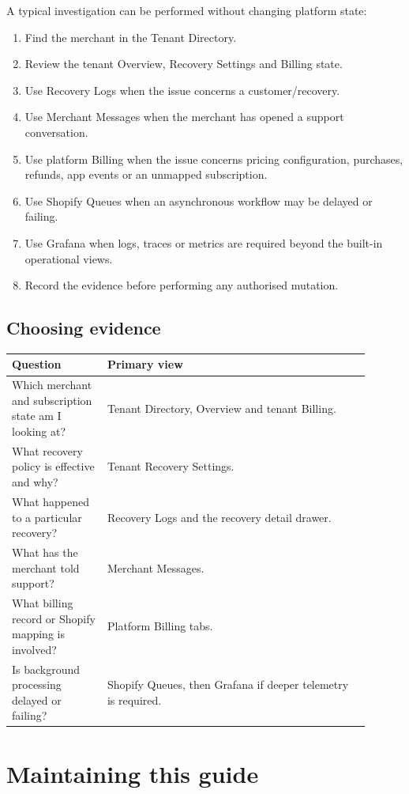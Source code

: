 A typical investigation can be performed without changing platform state:
\begin{enumerate}
  \item Find the merchant in the Tenant Directory.
  \item Review the tenant Overview, Recovery Settings and Billing state.
  \item Use Recovery Logs when the issue concerns a customer/recovery.
  \item Use Merchant Messages when the merchant has opened a support conversation.
  \item Use platform Billing when the issue concerns pricing configuration, purchases, refunds, app events or an unmapped subscription.
  \item Use Shopify Queues when an asynchronous workflow may be delayed or failing.
  \item Use Grafana when logs, traces or metrics are required beyond the built-in operational views.
  \item Record the evidence before performing any authorised mutation.
\end{enumerate}

\section{Choosing evidence}
\begin{longtable}{P{0.24\linewidth}P{0.66\linewidth}}
\toprule
\textbf{Question} & \textbf{Primary view}\\
\midrule
\endhead
Which merchant and subscription state am I looking at? & Tenant Directory, Overview and tenant Billing.\\
What recovery policy is effective and why? & Tenant Recovery Settings.\\
What happened to a particular recovery? & Recovery Logs and the recovery detail drawer.\\
What has the merchant told support? & Merchant Messages.\\
What billing record or Shopify mapping is involved? & Platform Billing tabs.\\
Is background processing delayed or failing? & Shopify Queues, then Grafana if deeper telemetry is required.\\
\bottomrule
\end{longtable}

\chapter{Maintaining this guide}

